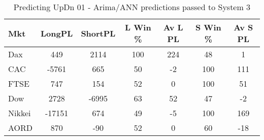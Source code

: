 \begin{table}[ht]
\centering
\caption[Predicting UpDn 01 - Arima/ANN predictions passed to System 3.]{Predicting UpDn 01 - Arima/ANN predictions passed to System 3} 
\label{tab:chp_ts:pUD_01_arima_ann_sys}
\begin{tabular}{lcccccc}
  \toprule Mkt & LongPL & ShortPL & L Win \% & Av L PL & S Win \% & Av S PL \\ 
  \midrule Dax & 449 & 2114 & 100 & 224 & 48 & 1 \\ 
  CAC & -5761 & 665 & 50 & -2 & 100 & 111 \\ 
  FTSE & 747 & 154 & 52 & 0 & 100 & 51 \\ 
  Dow & 2728 & -6995 & 63 & 52 & 47 & -2 \\ 
  Nikkei & -17151 & 674 & 49 & -5 & 100 & 169 \\ 
  AORD & 870 & -90 & 52 & 0 & 60 & -18 \\ 
   \bottomrule \end{tabular}
\end{table}
